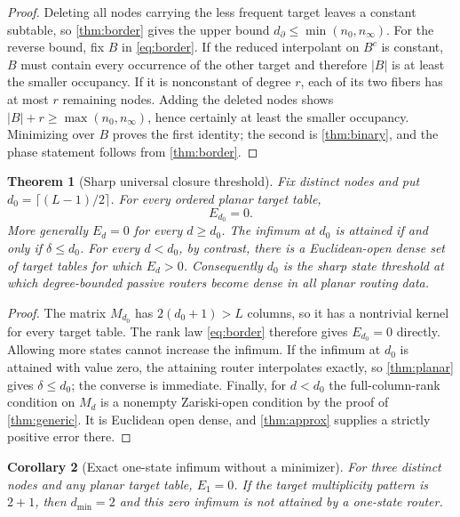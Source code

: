 \documentclass[11pt]{article}
\newtheorem{theorem}{Theorem}[section]
\newtheorem{corollary}[theorem]{Corollary}
\theoremstyle{definition}\newtheorem{definition}[theorem]{Definition}\newtheorem{example}[theorem]{Example}
\theoremstyle{remark}\newtheorem{remark}[theorem]{Remark}\newtheorem{limitation}[theorem]{Limitation}
\begin{document}
\begin{proof}
Deleting all nodes carrying the less frequent target leaves a constant
subtable, so \cref{thm:border} gives the upper bound
$d_\partial\le\min(n_0,n_\infty)$.  For the reverse bound, fix $B$ in
\eqref{eq:border}.  If the reduced interpolant on $B^c$ is constant, $B$ must
contain every occurrence of the other target and therefore $|B|$ is at least
the smaller occupancy.  If it is nonconstant of degree $r$, each of its two
fibers has at most $r$ remaining nodes.  Adding the deleted nodes shows
$|B|+r\ge\max(n_0,n_\infty)$, hence certainly at least the smaller occupancy.
Minimizing over $B$ proves the first identity; the second is
\cref{thm:binary}, and the phase statement follows from \cref{thm:border}.
\end{proof}

\begin{theorem}[Sharp universal closure threshold]\label{thm:closure}
Fix distinct nodes and put $d_0=\lceil(L-1)/2\rceil$.  For every ordered
planar target table,
\begin{equation}\label{eq:closure}
                              \boxed{E_{d_0}=0}.
\end{equation}
More generally $E_d=0$ for every $d\ge d_0$.  The infimum at $d_0$ is attained
if and only if $\delta\le d_0$.  For every $d<d_0$, by contrast, there is a
Euclidean-open dense set of target tables for which $E_d>0$.  Consequently
$d_0$ is the sharp state threshold at which degree-bounded passive routers
become dense in all planar routing data.
\end{theorem}

\begin{proof}
The matrix $M_{d_0}$ has $2(d_0+1)>L$ columns, so it has a nontrivial kernel
for every target table.  The rank law \eqref{eq:border} therefore gives
$E_{d_0}=0$ directly.  Allowing more states cannot increase the infimum.  If
the infimum at $d_0$ is attained with value zero, the attaining
router interpolates exactly, so \cref{thm:planar} gives $\delta\le d_0$; the
converse is immediate.  Finally, for $d<d_0$ the full-column-rank condition on
$M_d$ is a nonempty Zariski-open condition by the proof of
\cref{thm:generic}.  It is Euclidean open dense, and \cref{thm:approx} supplies
a strictly positive error there.
\end{proof}

\begin{corollary}[Exact one-state infimum without a minimizer]\label{cor:eone}
For three distinct nodes and any planar target table, $E_1=0$.  If the target
multiplicity pattern is $2+1$, then $d_{\min}=2$ and this zero infimum is not
attained by a one-state router.
\end{corollary}
\end{document}
